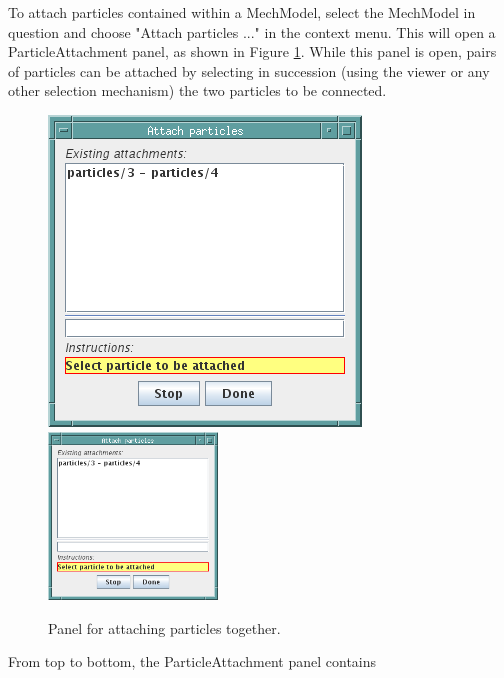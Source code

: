 \documentclass{article}
\begin{document}
To attach particles contained within a MechModel, select the MechModel in
question and choose {\sf "Attach particles ..."} in the context menu. This
will open a ParticleAttachment panel, as shown in
Figure \ref{attachParticlesPanelFig}. While this panel is open, pairs of particles
can be attached by selecting in succession (using the viewer or any
other selection mechanism) the two particles to be connected.

\begin{figure}
\begin{center}
\iflatexml
\includegraphics[]{images/attachParticlesPanel}
\else
\includegraphics[width=0.40\textwidth]{images/attachParticlesPanel}
\fi
\end{center}
\caption{Panel for attaching particles together.}%
\label{attachParticlesPanelFig}
\end{figure}

From top to bottom, the ParticleAttachment  panel contains
\end{document}
